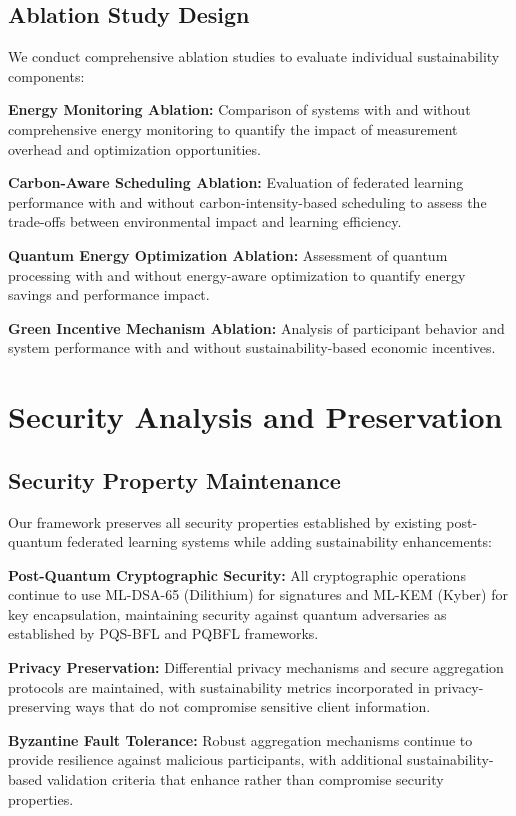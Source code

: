 \documentclass[10pt,journal,compsoc]{IEEEtran}
\begin{document}
\subsection{Ablation Study Design}

We conduct comprehensive ablation studies to evaluate individual sustainability components:

\textbf{Energy Monitoring Ablation:} Comparison of systems with and without comprehensive energy monitoring to quantify the impact of measurement overhead and optimization opportunities.

\textbf{Carbon-Aware Scheduling Ablation:} Evaluation of federated learning performance with and without carbon-intensity-based scheduling to assess the trade-offs between environmental impact and learning efficiency.

\textbf{Quantum Energy Optimization Ablation:} Assessment of quantum processing with and without energy-aware optimization to quantify energy savings and performance impact.

\textbf{Green Incentive Mechanism Ablation:} Analysis of participant behavior and system performance with and without sustainability-based economic incentives.

\section{Security Analysis and Preservation}

\subsection{Security Property Maintenance}

Our framework preserves all security properties established by existing post-quantum federated learning systems while adding sustainability enhancements:

\textbf{Post-Quantum Cryptographic Security:} All cryptographic operations continue to use ML-DSA-65 (Dilithium) for signatures and ML-KEM (Kyber) for key encapsulation, maintaining security against quantum adversaries as established by PQS-BFL and PQBFL frameworks.

\textbf{Privacy Preservation:} Differential privacy mechanisms and secure aggregation protocols are maintained, with sustainability metrics incorporated in privacy-preserving ways that do not compromise sensitive client information.

\textbf{Byzantine Fault Tolerance:} Robust aggregation mechanisms continue to provide resilience against malicious participants, with additional sustainability-based validation criteria that enhance rather than compromise security properties.
\end{document}
